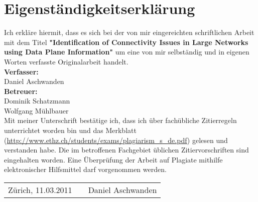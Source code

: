 

\chapter*{Eigenständigkeitserklärung} Ich erkläre hiermit, dass es sich bei
der von mir eingereichten schriftlichen Arbeit mit dem Titel
\textbf{"Identification of Connectivity Issues in Large Networks using Data
Plane Information"} um eine von mir selbständig und in eigenen Worten verfasste
Originalarbeit handelt.\\

\vspace{5mm} \textbf{Verfasser:}\\
Daniel Aschwanden\\

\vspace{5mm} \textbf{Betreuer:}\\
Dominik Schatzmann\\
Wolfgang Mühlbauer\\

\vspace{5mm} Mit meiner Unterschrift bestätige ich, dass ich über fachübliche
Zitierregeln unterrichtet worden bin und das Merkblatt
(\url{http://www.ethz.ch/students/exams/plagiarism_s_de.pdf}) gelesen und
verstanden habe. Die im betroffenen Fachgebiet üblichen Zitiervorschriften sind
eingehalten worden.
Eine Überprüfung der Arbeit auf Plagiate mithilfe elektronischer Hilfsmittel
darf vorgenommen werden.\\

\vspace{15mm} 
\begin{tabular}
	{l p{} r} Zürich, 11.03.2011 &&
	Daniel Aschwanden \\
\end{tabular}

\vfil